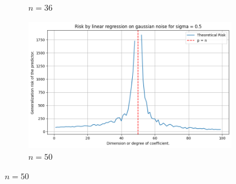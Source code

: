 \documentclass[twoside,10pt]{article}
\begin{document}
\begin{figure}[htb]
\begin{subfigure}[b]{\imgwidth}
    \caption{$n=36$}\label{fig:1c}
  \end{subfigure}%
  \hfill
  \begin{subfigure}[b]{\imgwidth}
    \includegraphics[width=\linewidth]{img/descent_lin_reg_4.png}
    \caption{$n=50$}\label{fig:1d}
  \end{subfigure}

  \medskip


\end{figure}
\end{document}
